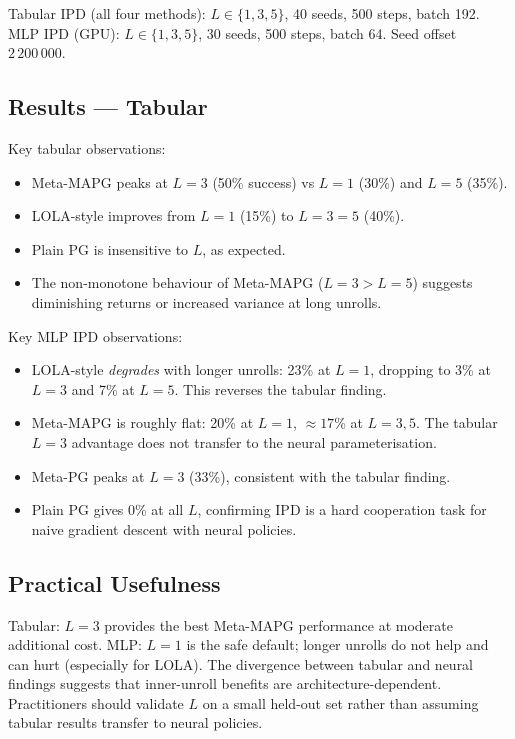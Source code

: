 \documentclass[11pt,a4paper]{article}
\begin{document}
Tabular IPD (all four methods): $L\in\{1,3,5\}$, 40 seeds, 500 steps,
batch 192. MLP IPD (GPU): $L\in\{1,3,5\}$, 30 seeds, 500 steps, batch 64.
Seed offset $2\,200\,000$.

\subsection{Results --- Tabular}



Key tabular observations:
\begin{itemize}
\item Meta-MAPG peaks at $L=3$ (50\% success) vs $L=1$ (30\%) and $L=5$ (35\%).
\item LOLA-style improves from $L=1$ (15\%) to $L=3=5$ (40\%).
\item Plain PG is insensitive to $L$, as expected.
\item The non-monotone behaviour of Meta-MAPG ($L=3>L=5$) suggests diminishing
  returns or increased variance at long unrolls.
\end{itemize}

Key MLP IPD observations:
\begin{itemize}
\item LOLA-style \emph{degrades} with longer unrolls: 23\% at $L=1$, dropping to
  3\% at $L=3$ and 7\% at $L=5$. This reverses the tabular finding.
\item Meta-MAPG is roughly flat: 20\% at $L=1$, $\approx17$\% at $L=3,5$.
  The tabular $L=3$ advantage does not transfer to the neural parameterisation.
\item Meta-PG peaks at $L=3$ (33\%), consistent with the tabular finding.
\item Plain PG gives 0\% at all $L$, confirming IPD is a hard cooperation task
  for naive gradient descent with neural policies.
\end{itemize}

\subsection{Practical Usefulness}

Tabular: $L=3$ provides the best Meta-MAPG performance at moderate additional
cost. MLP: $L=1$ is the safe default; longer unrolls do not help and can hurt
(especially for LOLA). The divergence between tabular and neural findings
suggests that inner-unroll benefits are architecture-dependent. Practitioners
should validate $L$ on a small held-out set rather than assuming tabular
results transfer to neural policies.
\end{document}
